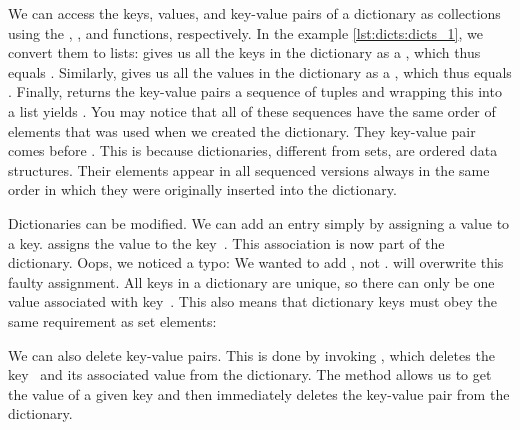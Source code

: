 \begin{sloppypar}%
We can access the keys, values, and key-value pairs of a dictionary as collections using the , , and  functions, respectively.
In the example \cref{lst:dicts:dicts_1}, we convert them to lists:
 gives us all the keys in the dictionary  as a , which thus equals \pythonil{[2, 1, 3, 4]}.
Similarly,  gives us all the values in the dictionary  as a , which thus equals .
Finally,  returns the key-value pairs a sequence of tuples and wrapping this into a list yields .
You may notice that all of these sequences have the same order of elements that was used when we created the dictionary.
They key-value pair  comes before .
This is because dictionaries, different from sets, are ordered data structures.
Their elements appear in all sequenced versions always in the same order in which they were originally inserted into the dictionary.%
\end{sloppypar}%
%
\begin{sloppypar}%
Dictionaries can be modified.
We can add an entry simply by assigning a value to a key.
 assigns the value  to the key~.
This association is now part of the dictionary.
Oops, we noticed a typo:
We wanted to add , not .
 will overwrite this faulty assignment.
All keys in a dictionary are unique, so there can only be one value associated with key~.
This also means that dictionary keys must obey the same requirement as set elements:%
\end{sloppypar}%
%
%
%
We can also delete key-value pairs.
This is done by invoking , which deletes the key~ and its associated value from the dictionary.
The method  allows us to get the value of a given key and then immediately deletes the key-value pair from the dictionary.
